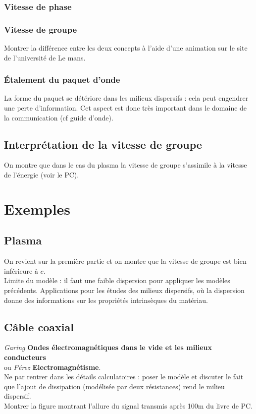 \documentclass[12pt,prb,aps,epsf]{article}
\begin{document}
\subsubsection{Vitesse de phase}
\subsubsection{Vitesse de groupe}
Montrer la différence entre les deux concepts à l'aide d'une animation sur le site de l'université de Le mans.

\subsubsection{Étalement du paquet d'onde}
La forme du paquet se détériore dans les milieux dispersifs : cela peut engendrer une perte d'information. Cet aspect est donc très important dans le domaine de la communication (cf guide d'onde).

\subsection{Interprétation de la vitesse de groupe}
On montre que dans le cas du plasma la vitesse de groupe s'assimile à la vitesse de l'énergie (voir le PC).

\section{Exemples}
\subsection{Plasma}
On revient sur la première partie et on montre que la vitesse de groupe est bien inférieure à $c$.\\

Limite du modèle : il faut une faible dispersion pour appliquer les modèles précédents. Applications pour les études des milieux dispersifs, où la dispersion donne des informations sur les propriétés intrinsèques du matériau.

\subsection{Câble coaxial}
\textit{Garing} \textbf{Ondes électromagnétiques dans le vide et les milieux conducteurs}\\ 
ou \textit{Pérez} \textbf{Electromagnétisme}.\\

Ne par rentrer dans les détails calculatoires : poser le modèle et discuter le fait que l'ajout de dissipation (modélisée par deux résistances) rend le milieu dispersif.\\ 
Montrer la figure montrant l'allure du signal transmis après 100m du livre de PC.
\end{document}

